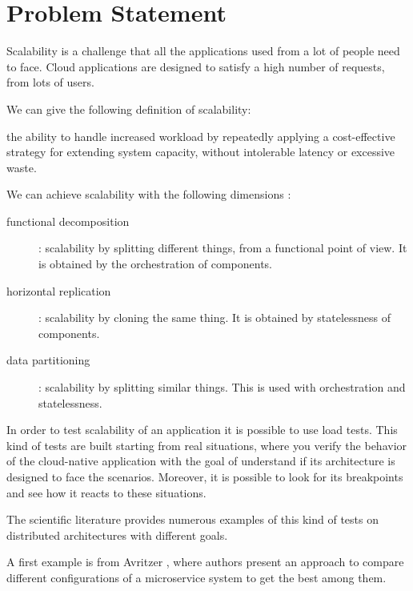 \chapter{Problem Statement\label{sec:problemstatement}}

Scalability is a challenge that all the applications used from a lot of people need to face.
Cloud applications are designed to satisfy a high number of requests, from lots of users.

We can give the following definition of scalability:
\begin{quoting}
    \omissis the ability to handle increased workload by repeatedly applying a cost-effective strategy for extending system capacity, without intolerable latency or excessive waste. \parencite{vardanega:slides}
\end{quoting}

We can achieve scalability with the following dimensions \parencite{eventuate_2021}:
\begin{description}
    \item[functional decomposition]: scalability by splitting different things, from a functional point of view. It is obtained by the orchestration of components.
    \item[horizontal replication]: scalability by cloning the same thing. It is obtained by statelessness of components.
    \item[data partitioning]: scalability by splitting similar things. This is used with orchestration and statelessness. 
\end{description}

In order to test scalability of an application it is possible to use load tests.
This kind of tests are built starting from real situations, where you verify the behavior of the cloud-native application with the goal of understand if its architecture is designed to face the scenarios.
Moreover, it is possible to look for its breakpoints and see how it reacts to these situations.

The scientific literature provides numerous examples of this kind of tests on distributed architectures with different goals.

A first example is from Avritzer \parencite{avritzer2020scalability}, where authors present an approach to compare different configurations of a microservice system to get the best among them.



